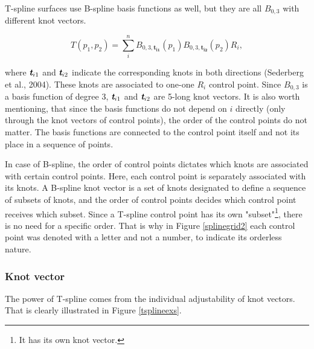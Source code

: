 \documentclass{article}
\begin{document}
T-spline surfaces use B-spline basis functions as well, but they are all $B_{0, 3}$ with different knot vectors.

\begin{equation}
T(p_1, p_2) = \sum_i^n B_{0,3,\mathbf{t_{i1}}}(p_1)B_{0,3,\mathbf{t_{i2}}}(p_2) R_{i},
\label{eq:tspline}
\end{equation}

where $\emph{\textbf{t}}_{i1}$ and $\emph{\textbf{t}}_{i2}$ indicate the corresponding knots in both directions (Sederberg et al., 2004). These knots are associated to one-one $R_i$ control point. Since $B_{0,3}$ is a basis function of degree 3, $\emph{\textbf{t}}_{i1}$ and $\emph{\textbf{t}}_{i2}$ are 5-long knot vectors. It is also worth mentioning, that since the basis functions do not depend on $i$ directly (only through the knot vectors of control points), the order of the control points do not matter. The basis functions are connected to the control point itself and not its place in a sequence of points.

\vspace{6pt}
In case of B-spline, the order of control points dictates which knots are associated with certain control points. Here, each control point is separately associated with its knots. A B-spline knot vector is a set of knots designated to define a sequence of subsets of knots, and the order of control points decides which control point receives which subset. Since a T-spline control point has its own "subset"\footnote{It has its own knot vector.}, there is no need for a specific order. That is why in Figure \ref{splinegrid2} each control point was denoted with a letter and not a number, to indicate its orderless nature.

\subsubsection{Knot vector}

\vspace{6pt}
The power of T-spline comes from the individual adjustability of knot vectors. That is clearly illustrated in Figure \ref{tsplineexs}.
\end{document}
